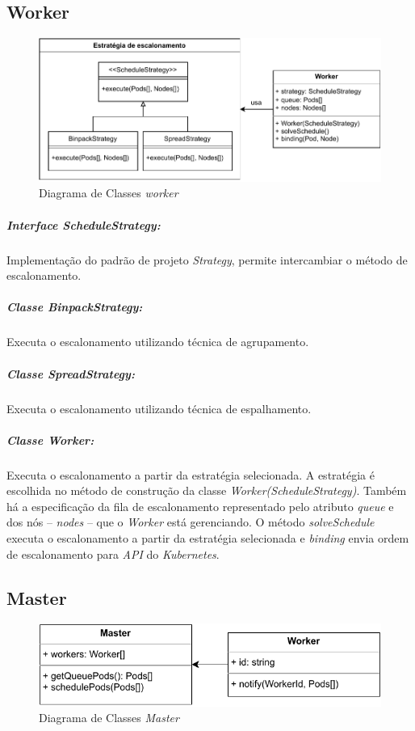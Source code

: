 \subsection{Worker}
\begin{figure}[h!]
	\caption{\label{fig:worker_class_diagram}Diagrama de Classes \textit{worker}}
	\centering
	\includegraphics[width=1\linewidth]{assets/worker-class-diagram.pdf}
\end{figure}

\subparagraph{Interface \textit{ScheduleStrategy}:}
Implementação do padrão de projeto \textit{Strategy}, permite intercambiar o método de escalonamento.

\subparagraph{Classe \textit{BinpackStrategy}:}
Executa o escalonamento utilizando técnica de agrupamento.

\subparagraph{Classe \textit{SpreadStrategy}:}
Executa o escalonamento utilizando técnica de espalhamento.

\subparagraph{Classe \textit{Worker}:}
Executa o escalonamento a partir da estratégia selecionada. A estratégia é escolhida no método de construção da classe \textit{Worker(ScheduleStrategy)}. Também há a especificação da fila de escalonamento representado pelo atributo \textit{queue} e dos nós -- \textit{nodes} -- que o \textit{Worker} está gerenciando. O método \textit{solveSchedule} executa o escalonamento a partir da estratégia selecionada e \textit{binding} envia ordem de escalonamento para \textit{API} do \textit{Kubernetes}.

\subsection{Master}
\begin{figure}[h!]
	\caption{\label{fig:master_class_diagram}Diagrama de Classes \textit{Master}}
	\centering
	\includegraphics[width=0.65\linewidth]{assets/master-class-diagram.pdf}
\end{figure}

